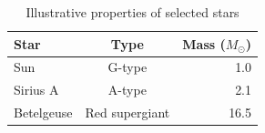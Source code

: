 \begin{table}[htbp]
    \centering
    \caption{Illustrative properties of selected stars}
    \label{tab:stellar-properties}
    \begin{tabular}{lcr}
        \toprule
        Star & Type & Mass ($M_\odot$) \\
        \midrule
        Sun & G-type & 1.0 \\
        Sirius A & A-type & 2.1 \\
        Betelgeuse & Red supergiant & 16.5 \\
        \bottomrule
    \end{tabular}
\end{table}
